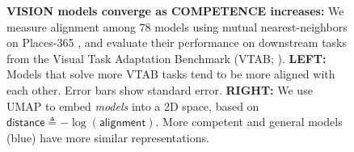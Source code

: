 \documentclass{article}
\theoremstyle{plain}
\theoremstyle{definition}
\theoremstyle{remark}
\begin{document}
\begin{figure}[ht!]
    \vspace{-2pt}
    \begin{minipage}[t]{0.65\textwidth}
        \hspace{-0.1in}
        \hfill
    \end{minipage}%
    \hfill
    \begin{minipage}[t]{0.35\textwidth}
        \vspace{-0.075in}
        \caption{%
            \small \textbf{VISION models converge as COMPETENCE increases:} We measure alignment among $78$ models using mutual nearest-neighbors on Places-365 \cite{zhou2017places}, and evaluate their performance on downstream tasks from the Visual Task Adaptation Benchmark (VTAB; \citet{zhai2019vtab}). \textbf{LEFT:} Models that solve more VTAB tasks tend to be more aligned with each other. Error bars show standard error. \textbf{RIGHT:} We use UMAP to embed \emph{models} into a 2D space, based on $\mathsf{distance} \triangleq -\log (\mathsf{alignment})$. More competent and general models (blue) have more similar representations.}
        \label{fig:vm_align}
    \end{minipage}
    \vspace{-16pt}
\end{figure}
\end{document}
